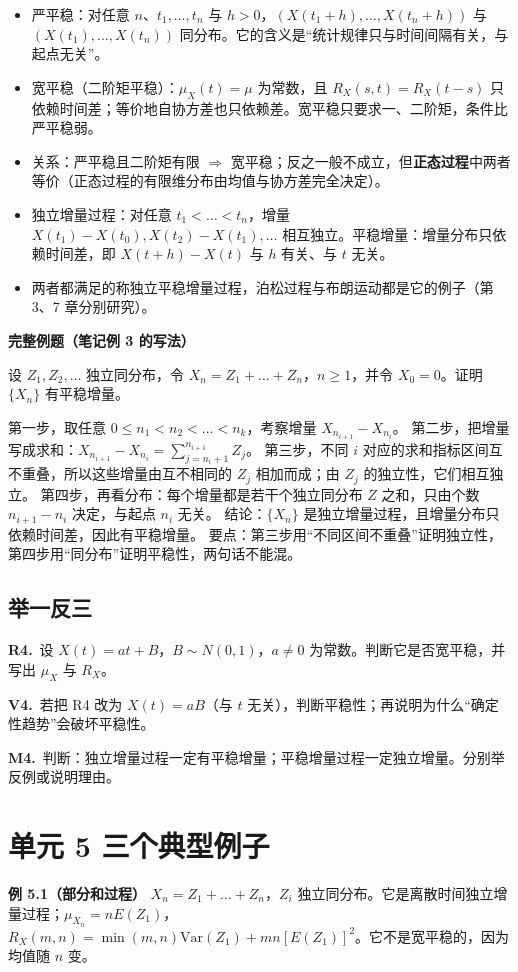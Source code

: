 \documentclass[UTF8,a4paper,11pt]{ctexart}
\newcommand{\CompactQuestion}[2]{\par\noindent\textbf{#1.}\ #2\par\vspace{.8em}}
\begin{document}
\begin{itemize}
\item 严平稳：对任意 $n$、$t_1,\dots,t_n$ 与 $h>0$，$(X(t_1+h),\dots,X(t_n+h))$ 与 $(X(t_1),\dots,X(t_n))$ 同分布。它的含义是“统计规律只与时间间隔有关，与起点无关”。
\item 宽平稳（二阶矩平稳）：$\mu_X(t)=\mu$ 为常数，且 $R_X(s,t)=R_X(t-s)$ 只依赖时间差；等价地自协方差也只依赖差。宽平稳只要求一、二阶矩，条件比严平稳弱。
\item 关系：严平稳且二阶矩有限 $\Rightarrow$ 宽平稳；反之一般不成立，但\textbf{正态过程}中两者等价（正态过程的有限维分布由均值与协方差完全决定）。
\item 独立增量过程：对任意 $t_1<\dots<t_n$，增量 $X(t_1)-X(t_0),X(t_2)-X(t_1),\dots$ 相互独立。平稳增量：增量分布只依赖时间差，即 $X(t+h)-X(t)$ 与 $h$ 有关、与 $t$ 无关。
\item 两者都满足的称独立平稳增量过程，泊松过程与布朗运动都是它的例子（第 3、7 章分别研究）。
\end{itemize}
\textbf{完整例题（笔记例 3 的写法）}

设 $Z_1,Z_2,\dots$ 独立同分布，令 $X_n=Z_1+\dots+Z_n$，$n\ge1$，并令 $X_0=0$。证明 $\{X_n\}$ 有平稳增量。

第一步，取任意 $0\le n_1<n_2<\dots<n_k$，考察增量 $X_{n_{i+1}}-X_{n_i}$。 第二步，把增量写成求和：$X_{n_{i+1}}-X_{n_i}=\sum_{j=n_i+1}^{n_{i+1}}Z_j$。 第三步，不同 $i$ 对应的求和指标区间互不重叠，所以这些增量由互不相同的 $Z_j$ 相加而成；由 $Z_j$ 的独立性，它们相互独立。 第四步，再看分布：每个增量都是若干个独立同分布 $Z$ 之和，只由个数 $n_{i+1}-n_i$ 决定，与起点 $n_i$ 无关。 结论：$\{X_n\}$ 是独立增量过程，且增量分布只依赖时间差，因此有平稳增量。 要点：第三步用“不同区间不重叠”证明独立性，第四步用“同分布”证明平稳性，两句话不能混。

\subsection{举一反三}
\CompactQuestion{R4}{设 $X(t)=at+B$，$B\sim N(0,1)$，$a\ne0$ 为常数。判断它是否宽平稳，并写出 $\mu_X$ 与 $R_X$。}
\CompactQuestion{V4}{若把 R4 改为 $X(t)=aB$（与 $t$ 无关），判断平稳性；再说明为什么“确定性趋势”会破坏平稳性。}
\CompactQuestion{M4}{判断：独立增量过程一定有平稳增量；平稳增量过程一定独立增量。分别举反例或说明理由。}
\clearpage
{}
\section{单元 5 三个典型例子}
\textbf{例 5.1（部分和过程）} $X_n=Z_1+\dots+Z_n$，$Z_i$ 独立同分布。它是离散时间独立增量过程；$\mu_{X_n}=nE(Z_1)$，$R_X(m,n)=\min(m,n)\mathrm{Var}(Z_1)+mn[E(Z_1)]^2$。它不是宽平稳的，因为均值随 $n$ 变。
\end{document}
